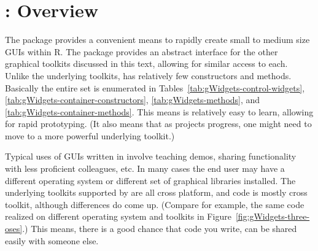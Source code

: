 






 
\newcommand{\ONLYIN}[1]{[only in #1]}

\chapter{: Overview}
\label{sec:overview}




The  package provides a convenient means to rapidly
create small to medium size GUIs within R. The package provides an
abstract interface for the other graphical toolkits discussed in this
text, allowing for similar access to each. Unlike the underlying
toolkits,  has relatively few constructors and
methods. Basically the entire set is enumerated in
Tables~\ref{tab:gWidgets-control-widgets},
\ref{tab:gWidgets-container-constructors}, \ref{tab:gWidgets-methods},
and \ref{tab:gWidgets-container-methods}. This means  is
relatively easy to learn, allowing for rapid prototyping. (It also
means that as projects progress, one might need to move to a more
powerful underlying toolkit.) 

Typical uses of GUIs written in \R{} involve teaching demos, sharing
functionality with less proficient colleagues, etc. In many cases the
end user may have a different operating system or different set of
graphical libraries installed.  The underlying toolkits supported by
 are all cross platform, and  code is
mostly cross toolkit, although differences do come up. (Compare for
example, the same code realized on different operating system and
toolkits in Figure~\ref{fig:gWidgets-three-oses}.) This means, there
is a good chance that code you write, can be shared easily with
someone else.



